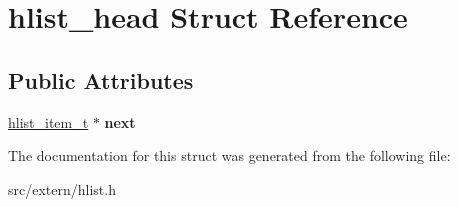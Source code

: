 \hypertarget{structhlist__head}{\section{hlist\+\_\+head Struct Reference}
\label{structhlist__head}
}
\subsection*{Public Attributes}
\begin{DoxyCompactItemize}
\item 
\hypertarget{structhlist__head_aa5596c5f17b46608d309c6071224b27a}{\hyperlink{structhlist__item}{hlist\+\_\+item\+\_\+t} $\ast$ {\bfseries next}}\label{structhlist__head_aa5596c5f17b46608d309c6071224b27a}

\end{DoxyCompactItemize}


The documentation for this struct was generated from the following file\+:\begin{DoxyCompactItemize}
\item 
src/extern/hlist.\+h\end{DoxyCompactItemize}
